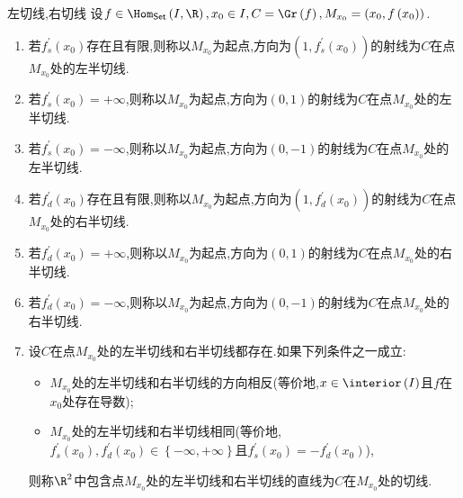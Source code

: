 \begin{definition}{左切线,右切线}{}
	设$f\in\Hom_{\mathsf{Set}}\left(I,\R\right),x_{0}\in I,C=\Gr\left(f\right),M_{x_{0}}=\left(x_{0},f\left(x_{0}\right)\right)$.
	\begin{enumerate}
		\item 若$f_{s}^{\prime}\left(x_{0}\right)$存在且有限,则称以$M_{x_{0}}$为起点,方向为$\left(1,f_{s}^{\prime}\left(x_{0}\right)\right)$的射线为$C$在点$M_{x_{0}}$处的左半切线.
		\item 若$f_{s}^{\prime}\left(x_{0}\right)=+\infty$,则称以$M_{x_{0}}$为起点,方向为$\left(0,1\right)$的射线为$C$在点$M_{x_{0}}$处的左半切线.
		\item 若$f_{s}^{\prime}\left(x_{0}\right)=-\infty$,则称以$M_{x_{0}}$为起点,方向为$\left(0,-1\right)$的射线为$C$在点$M_{x_{0}}$处的左半切线.
		\item 若$f_{d}^{\prime}\left(x_{0}\right)$存在且有限,则称以$M_{x_{0}}$为起点,方向为$\left(1,f_{d}^{\prime}\left(x_{0}\right)\right)$的射线为$C$在点$M_{x_{0}}$处的右半切线.
		\item 若$f_{d}^{\prime}\left(x_{0}\right)=+\infty$,则称以$M_{x_{0}}$为起点,方向为$\left(0,1\right)$的射线为$C$在点$M_{x_{0}}$处的右半切线.
		\item 若$f_{d}^{\prime}\left(x_{0}\right)=-\infty$,则称以$M_{x_{0}}$为起点,方向为$\left(0,-1\right)$的射线为$C$在点$M_{x_{0}}$处的右半切线.
		\item 设$C$在点$M_{x_{0}}$处的左半切线和右半切线都存在.如果下列条件之一成立:
		\begin{itemize}
			\item $M_{x_{0}}$处的左半切线和右半切线的方向相反(等价地,$x\in\interior\left(I\right)$且$f$在$x_{0}$处存在导数);
			\item $M_{x_{0}}$处的左半切线和右半切线相同(等价地,$f_{s}^{\prime}\left(x_{0}\right),f_{d}^{\prime}\left(x_{0}\right)\in\left\{-\infty,+\infty\right\}$且$f_{s}^{\prime}\left(x_{0}\right)=-f_{d}^{\prime}\left(x_{0}\right)$),
		\end{itemize}
		则称$\R^{2}$中包含点$M_{x_{0}}$处的左半切线和右半切线的直线为$C$在$M_{x_{0}}$处的切线.
	\end{enumerate}
\end{definition}

